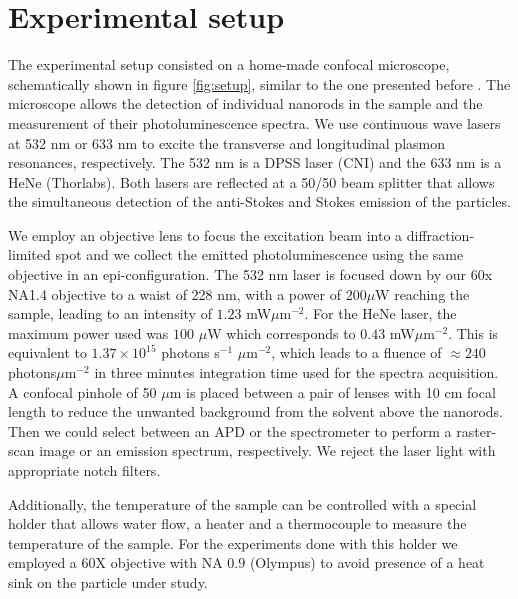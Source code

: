 \documentclass[journal=nalefd,manuscript=letter]{achemso}
\begin{document}
\section{Experimental setup}\label{sec:setup}

The experimental setup consisted on a home-made confocal microscope, schematically shown in figure
\ref{fig:setup}, similar to the one presented before \cite{Carattino2016a}. The microscope allows 
the detection of individual nanorods in the sample and the measurement of their photoluminescence spectra. 
We use continuous wave lasers at 532 nm or 633 nm to excite the transverse and longitudinal plasmon resonances, respectively. The  532 nm is a DPSS laser (CNI) and the 633 nm is a HeNe (Thorlabs). Both lasers are reflected at a 50/50 beam splitter that allows the simultaneous detection of the anti-Stokes and Stokes emission of the particles.

We employ an objective lens to focus the excitation beam into a diffraction-limited 
spot and we collect the emitted photoluminescence using the same objective in an epi-configuration. 
The 532 nm laser is focused down by our 60x NA1.4 objective to a waist of 228 nm, with a power of $200 \mu$W reaching the sample, leading to an intensity of $1.23$ mW$\mu$m$^{-2}$. 
For the HeNe laser, the maximum power used was $100$ $\mu$W which 
corresponds to $0.43$ mW$\mu$m$^{-2}$. This is equivalent to $1.37\times10^{15}$ photons s$^{-1}$ $\mu$m$^{-2}$, which leads to a fluence of $\approx 240$ photons$\mu$m$^{-2}$ in three minutes integration time used for the spectra acquisition. 
A confocal pinhole of 50 $\mu$m is placed between a pair of lenses with 10 cm focal length to reduce the unwanted background from the solvent above the nanorods. Then we could select between an APD or the spectrometer to perform a raster-scan image or an emission spectrum, respectively. We reject the laser light with appropriate notch filters.

Additionally, the temperature of the sample can be controlled with a special holder that allows 
water flow, a heater and a thermocouple to measure the temperature of the sample. For the experiments
done with this holder we employed a 60X objective with NA $0.9$ (Olympus) to avoid presence of a heat sink on the 
particle under study.
\end{document}

